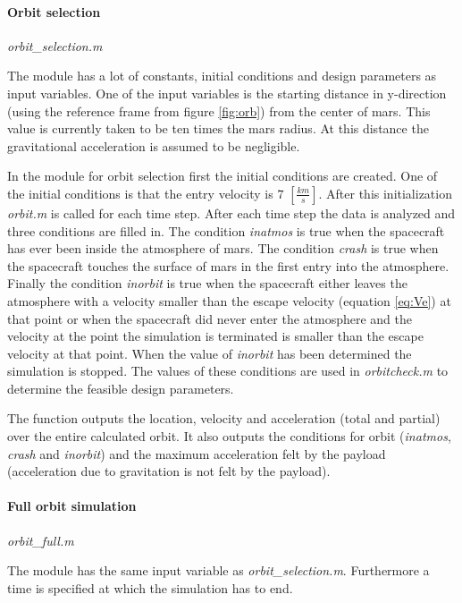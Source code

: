 \paragraph{Orbit selection} \textit{orbit\_selection.m}

The module has a lot of constants, initial conditions and design parameters as input variables. One of the input variables is the starting distance in y-direction (using the reference frame from figure \ref{fig:orb}) from the center of mars. This value is currently taken to be ten times the mars radius. At this distance the gravitational acceleration is assumed to be negligible. 

In the module for orbit selection first the initial conditions are created. One of the initial conditions is that the entry velocity is $7$ $[\frac{km}{s}]$. After this initialization \textit{orbit.m} is called for each time step. After each time step the data is analyzed and three conditions are filled in. The condition \textit{inatmos} is true when the spacecraft has ever been inside the atmosphere of mars. The condition \textit{crash} is true when the spacecraft touches the surface of mars in the first entry into the atmosphere. Finally the condition \textit{inorbit} is true when the spacecraft either leaves the atmosphere with a velocity smaller than the escape velocity (equation \ref{eq:Ve}) at that point or when the spacecraft did never enter the atmosphere and the velocity at the point the simulation is terminated is smaller than the escape velocity at that point. When the value of \textit{inorbit} has been determined the simulation is stopped. The values of these conditions are used in \textit{orbitcheck.m} to determine the feasible design parameters.

The function outputs the location, velocity and acceleration (total and partial) over the entire calculated orbit. It also outputs the conditions for orbit (\textit{inatmos}, \textit{crash} and \textit{inorbit}) and the maximum acceleration felt by the payload (acceleration due to gravitation is not felt by the payload).

\paragraph{Full orbit simulation} \textit{orbit\_full.m}

The module has the same input variable as \textit{orbit\_selection.m}. Furthermore a time is specified at which the simulation has to end.

